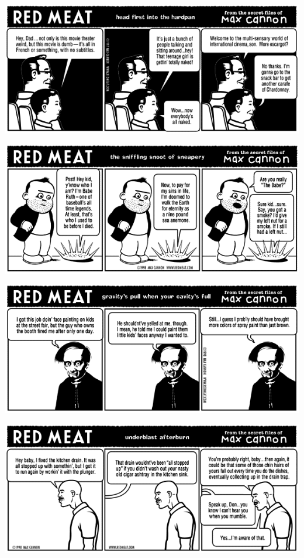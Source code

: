 \documentclass[a4paper,twoside,11pt]{article}
\begin{document}
\includegraphics[width=\textwidth]{redmeat_1998-06-08.png}



\includegraphics[width=\textwidth]{redmeat_1998-06-15.png}



\includegraphics[width=\textwidth]{redmeat_1998-06-22.png}



\includegraphics[width=\textwidth]{redmeat_1998-06-29.png}
\end{document}

